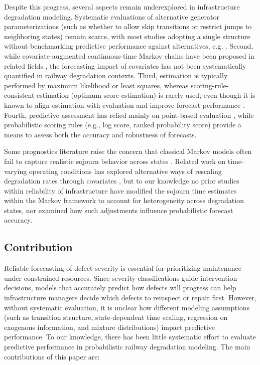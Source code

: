 \documentclass{article}
\begin{document}
Despite this progress, several aspects remain underexplored in infrastructure degradation modeling.
Systematic evaluations of alternative generator parameterizations (such as whether to allow skip transitions or restrict jumps to neighboring states) remain scarce, with most studies adopting a single structure without benchmarking predictive performance against alternatives, e.g. \citep{bisgaard2024A,Zbiciak2025}.
Second, while covariate-augmented continuous-time Markov chains have been proposed in related fields \citep{Wu2021ConditionPrediction}, the forecasting impact of covariates has not been systematically quantified in railway degradation contexts.
Third, estimation is typically performed by maximum likelihood or least squares, whereas scoring-rule-consistent estimation (optimum score estimation) is rarely used, even though it is known to align estimation with evaluation and improve forecast performance \citep{Gneiting2007,friedman1983a,Copas1983}.
Fourth, predictive assessment has relied mainly on point-based evaluation \citep{JimenezRoa2024Nonhomogeneous,Mizutani2023RegimeSwitching}, while probabilistic scoring rules (e.g., log score, ranked probability score) provide a means to assess both the accuracy and robustness of forecasts.

Some prognostics literature raise the concern that classical Markov models often fail to capture realistic sojourn behavior across states \citep{AIZPURUA2022}. Related work on time-varying operating conditions has explored alternative ways of rescaling degradation rates through covariates \citep{liu2024a,bisgaard2024A}, but to our knowledge no prior studies within reliability of infrastructure have modified the sojourn time estimates within the Markov framework to account for heterogeneity across degradation states, nor examined how such adjustments influence probabilistic forecast accuracy.
















\subsection{Contribution}
Reliable forecasting of defect severity is essential for prioritizing maintenance under constrained resources. Since severity classifications guide intervention decisions, models that accurately predict how defects will progress can help infrastructure managers decide which defects to reinspect or repair first. However, without systematic evaluation, it is unclear how different modeling assumptions (such as transition structure, state-dependent time scaling, regression on exogenous information, and mixture distributions) impact predictive performance. To our knowledge, there has been little systematic effort to evaluate predictive performance in probabilistic railway degradation modeling. 
The main contributions of this paper are:
\end{document}
